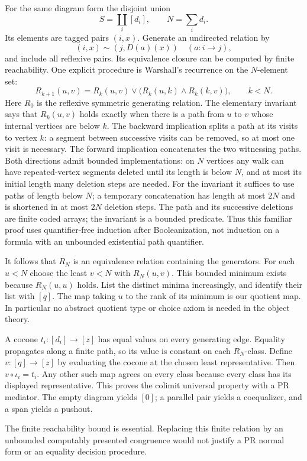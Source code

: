 For the same diagram form the disjoint union
\[
 S=\coprod_i[d_i],\qquad N=\sum_i d_i.
\]
Its elements are tagged pairs $(i,x)$.  Generate an undirected relation by
\[
 (i,x)\sim(j,D(a)(x))\quad(a:i\to j),
\]
and include all reflexive pairs.  Its equivalence closure can be computed by
finite reachability.  One explicit procedure is Warshall's recurrence on the
$N$-element set:
\[
 R_{k+1}(u,v)=R_k(u,v)\lor\bigl(R_k(u,k)\land R_k(k,v)\bigr),
 \qquad k<N.
\]
Here $R_0$ is the reflexive symmetric generating relation.  The elementary
invariant says that $R_k(u,v)$ holds exactly when there is a path from $u$ to $v$
whose internal vertices are below $k$.  The backward implication splits a path
at its visits to vertex $k$: a segment between successive visits can be removed,
so at most one visit is necessary.  The forward implication concatenates the
two witnessing paths.  Both directions admit bounded implementations: on $N$
vertices any walk can have repeated-vertex segments deleted until its length is
below $N$, and at most its initial length many deletion steps are needed.
For the invariant it suffices to use paths of length below $N$; a temporary
concatenation has length at most $2N$ and is shortened in at most $2N$ deletion
steps.  The path and its successive deletions are finite coded arrays; the
invariant is a bounded predicate.  Thus this familiar proof uses quantifier-free induction
after Booleanization, not induction on a formula with an unbounded existential
path quantifier.

It follows that $R_N$ is an equivalence relation containing the generators.
For each $u<N$ choose the least $v<N$ with $R_N(u,v)$.  This bounded minimum
exists because $R_N(u,u)$ holds.  List the distinct minima increasingly, and
identify their list with $[q]$.  The map taking $u$ to the rank of its minimum is
our quotient map.  In particular no abstract quotient type or choice axiom is
needed in the object theory.

A cocone $t_i:[d_i]\to[z]$ has equal values on every generating edge.  Equality
propagates along a finite path, so its value is constant on each $R_N$-class.
Define $v:[q]\to[z]$ by evaluating the cocone at the chosen least
representative.  Then $v\circ\iota_i=t_i$.  Any other such map agrees on every
class because every class has its displayed representative.  This proves the
colimit universal property with a PR mediator.  The empty diagram yields
$[0]$; a parallel pair yields a coequalizer, and a span yields a pushout.

The finite reachability bound is essential.  Replacing this finite relation by
an unbounded computably presented congruence would not justify a PR normal form
or an equality decision procedure.

